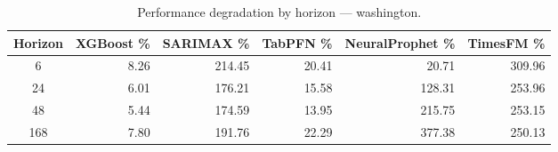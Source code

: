 \begin{table}[h]
\centering
\caption{Performance degradation by horizon — washington.}
\label{tab:degradation_horizon_washington}
\begin{tabular}{crrrrr}
\toprule
Horizon & XGBoost \% & SARIMAX \% & TabPFN \% & NeuralProphet \% & TimesFM \% \\
\midrule
6 & 8.26 & 214.45 & 20.41 & 20.71 & 309.96 \\
24 & 6.01 & 176.21 & 15.58 & 128.31 & 253.96 \\
48 & 5.44 & 174.59 & 13.95 & 215.75 & 253.15 \\
168 & 7.80 & 191.76 & 22.29 & 377.38 & 250.13 \\
\bottomrule
\end{tabular}
\end{table}
